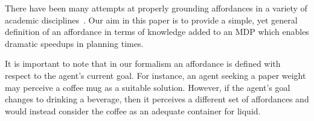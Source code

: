 \documentclass[]{article}
\begin{document}
There have been many attempts at
properly grounding affordances in a variety of academic
disciplines~\citep{koppula13a,harston03,koppula13b,gorniak06,kaschak00}. 
Our aim in this paper is to provide a simple, yet general definition of an
affordance in terms of knowledge added to an MDP which enables
dramatic speedups in planning times.

It is important to note that in our formalism an affordance is defined with respect to the
agent's current goal. For instance, an agent seeking a paper weight may perceive a coffee mug as a suitable
solution. However, if the agent's goal changes to drinking a beverage, then it perceives a different
set of affordances and would instead consider the coffee as an adequate container for liquid.




\end{document}
